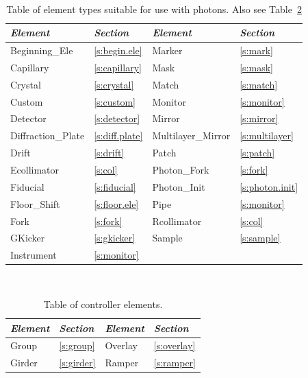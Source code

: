 \begin{table}[ht]
\centering
{\tt
\begin{tabular}{llll} \toprule
  {\it Element}      & {\it Section}         & {\it Element}         & {\it Section}       \\ \midrule
  Beginning_Ele      & \ref{s:begin.ele}     &  Marker               & \ref{s:mark}        \\
  Capillary          & \ref{s:capillary}     &  Mask                 & \ref{s:mask}        \\
  Crystal            & \ref{s:crystal}       &  Match                & \ref{s:match}       \\
  Custom             & \ref{s:custom}        &  Monitor              & \ref{s:monitor}     \\ 
  Detector           & \ref{s:detector}      &  Mirror               & \ref{s:mirror}      \\
  Diffraction_Plate  & \ref{s:diff.plate}    &  Multilayer_Mirror    & \ref{s:multilayer}  \\
  Drift              & \ref{s:drift}         &  Patch                & \ref{s:patch}       \\
  Ecollimator        & \ref{s:col}           &  Photon_Fork          & \ref{s:fork}        \\
  Fiducial           & \ref{s:fiducial}      &  Photon_Init          & \ref{s:photon.init} \\
  Floor_Shift        & \ref{s:floor.ele}     &  Pipe                 & \ref{s:monitor}     \\
  Fork               & \ref{s:fork}          &  Rcollimator          & \ref{s:col}         \\
  GKicker            & \ref{s:gkicker}       &  Sample               & \ref{s:sample}      \\
  Instrument         & \ref{s:monitor}       &                       &                     \\
  \bottomrule
\end{tabular}
}
\caption{Table of element types suitable for use with photons. Also see Table~\ref{t:control.classes}}
\label{t:photon.classes}
\end{table}

\begin{table}[ht]
\centering
{\tt
\begin{tabular}{llll} \toprule
  {\it Element}  & {\it Section}     & {\it Element}  & {\it Section}    \\ \midrule
  Group          & \ref{s:group}     &  Overlay       & \ref{s:overlay}  \\
  Girder         & \ref{s:girder}    &  Ramper        & \ref{s:ramper}   \\ \bottomrule
\end{tabular}
}
\caption{Table of controller elements.}
\label{t:control.classes}
\end{table}

